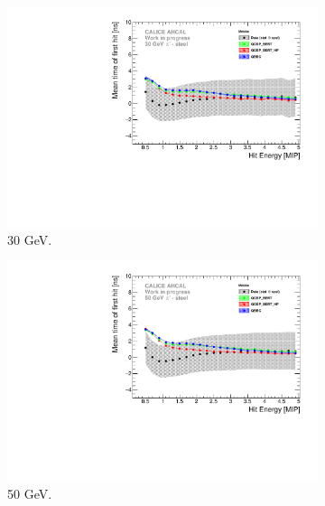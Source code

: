 \documentclass{JINST}
\begin{document}

\begin{figure}[htbp!]
  \begin{subfigure}[t]{0.49\textwidth}
    \centering
    \includegraphics[width=1\textwidth]{fig/Time_Energy_30GeV_Mokka.pdf}
    \caption{30 GeV.}\label{fig:Energy_SimData_30GeV}
  \end{subfigure}
  \hfill
  \begin{subfigure}[t]{0.49\textwidth}
    \centering
    \includegraphics[width=1\textwidth]{fig/Time_Energy_50GeV_Mokka.pdf}
    \caption{50 GeV.} \label{fig:Energy_SimData_50GeV}
  \end{subfigure}
  \hfill
  \begin{subfigure}[t]{0.49\textwidth}

\end{subfigure}
\end{figure}
\end{document}
